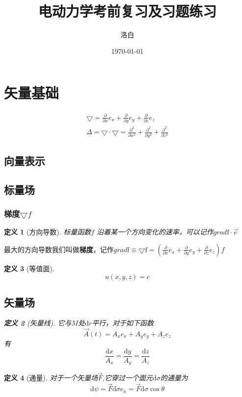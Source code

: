 \documentclass[twocolumn]{ctexart}
\title{电动力学考前复习及习题练习}
\author{洛白}
\date{\today}
\newtheorem{definition}{定义}[section]
\begin{document}
\maketitle
\newpage

\renewcommand{\baselinestretch}{1.35}
\tableofcontents
\newpage

\setlength{\parskip}{0em}
\renewcommand{\baselinestretch}{1.53}


\section{矢量基础}
\begin{align}
  \bigtriangledown=\frac{\partial }{\partial x}e_x+\frac{\partial }{\partial y}e_y+\frac{\partial }{\partial z}e_z  
  \tag{1.1.a} \\
  \Delta=\bigtriangledown \cdot \bigtriangledown=\frac{\partial^2 }{\partial x^2}+\frac{\partial^2 }{\partial y^2}+\frac{\partial^2 }{\partial z^2}
  \tag{1.1.b} 
\end{align}
\subsection{向量表示}

\subsection{标量场}
\subsubsection{梯度$\bigtriangledown f$}
\begin{definition}[方向导数]
标量函数$f$ 沿着某一个方向变化的速率，可以记作$grad \mathrm{f}\cdot \vec{e}$
\end{definition}
最大的方向导数我们叫做\textbf{梯度}，记作$grad \mathrm{f}\equiv \bigtriangledown \mathrm{f}=(\frac{\partial }{\partial x}e_x+\frac{\partial }{\partial y}e_y+\frac{\partial }{\partial z}e_z )f $
\begin{definition}[等值面]
$$
u(x,y,z)=c
$$
\subsection{矢量场}
\begin{definition}[矢量线]
它与$M$处$\mathrm{d}{r}$平行，对于如下函数
$$
\vec{A}(t)=A_xe_x+A_ye_y+A_ze_z
$$
有 $$\frac{\mathrm{d}{x}}{A_x}=\frac{\mathrm{d}{y}}{A_y}=\frac{\mathrm{d}{z}}{A_z}$$

\end{definition}
\end{definition}
\begin{definition}[通量]
对于一个矢量场$\vec{F}$,它穿过一个面元$\mathrm{d}{\sigma}$的通量为
\begin{equation}
\mathrm{d}\psi=\vec{F} \mathrm{d}{\sigma} e_n=\vec{F} \mathrm{d}{\sigma} \cos \theta \tag{1.2}
\end{equation} 
\end{definition}
\end{document}
